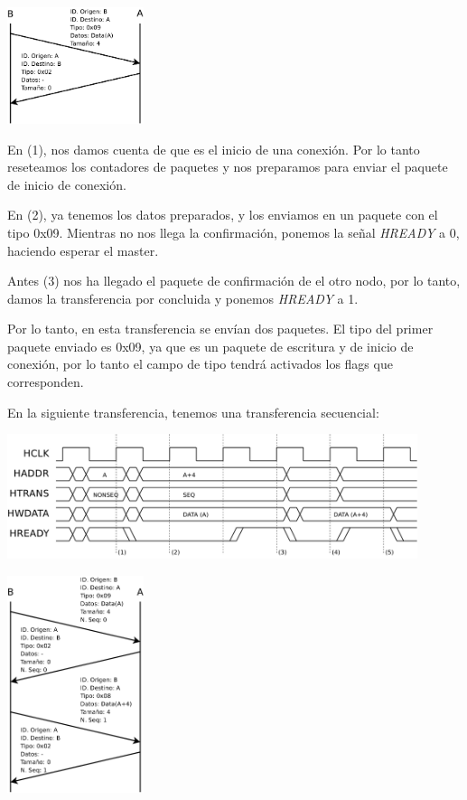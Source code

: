 \documentclass[a4paper, 12pt, babel, spanish]{article}
\begin{document}
\begin{floatingfigure}[r]{0.3\textwidth}
\includegraphics[width=0.3\textwidth]{fig/waves/net_norm}
\end{floatingfigure}

En (1), nos damos cuenta de que es el inicio de una conexión. Por lo tanto reseteamos los contadores de paquetes y nos preparamos para enviar el paquete de inicio de conexión.

En (2), ya tenemos los datos preparados, y los enviamos en un paquete con el tipo 0x09. Mientras no nos llega la confirmación, ponemos la señal \emph{HREADY} a 0, haciendo esperar el master.

Antes (3) nos ha llegado el paquete de confirmación de el otro nodo, por lo tanto, damos la transferencia por concluida y ponemos \emph{HREADY} a 1.

Por lo tanto, en esta transferencia se envían dos paquetes. El tipo del primer paquete enviado es 0x09, ya que es un paquete de escritura y de inicio de conexión, por lo tanto el campo de tipo tendrá activados los flags que corresponden.

\newpage

En la siguiente transferencia, tenemos una transferencia secuencial:

\begin{center}
\includegraphics[width=0.9\textwidth]{fig/waves/trans_seq}
\end{center}

\begin{floatingfigure}[r]{0.3\textwidth}
\includegraphics[width=0.3\textwidth]{fig/waves/net_seq}
\end{floatingfigure}
\end{document}

